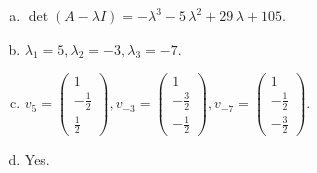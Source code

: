\begin{questions}
\begin{solution}
\begin{enumerate}[(a)]
\item $\det(A-\lambda I)=-{\lambda}^{3} - 5 \, {\lambda}^{2} + 29 \, {\lambda} + 105$.
\item ${\lambda}_1=5, {\lambda}_2=-3, {\lambda}_3=-7$.
\item $v_{5}=\left(\begin{array}{r}
1 \\
-\frac{1}{2} \\
\frac{1}{2}
\end{array}\right), v_{-3}=\left(\begin{array}{r}
1 \\
-\frac{3}{2} \\
-\frac{1}{2}
\end{array}\right), v_{-7}=\left(\begin{array}{r}
1 \\
-\frac{1}{2} \\
-\frac{3}{2}
\end{array}\right)$.
\item Yes.
\end{enumerate}
\end{solution}

\end{questions}

\newpage


\begin{center}
\end{center}

